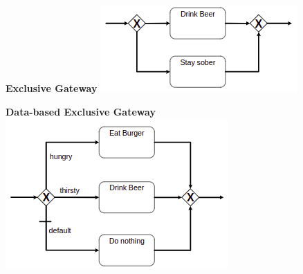    \begin{minipage}[t]{0.3\textwidth}
    \centering
    \textbf{Exclusive Gateway}
    \newline
    \newline
    \newline
    \newline
    \newline
	\includegraphics[width=1.05\linewidth]{images/BPMN_exclusive-gateway.png}
    \end{minipage}
    \begin{minipage}[t]{0.3\textwidth}
    \centering
    \textbf{Data-based Exclusive Gateway}
    \newline
    \newline
	\includegraphics[width=1.025\linewidth]{images/BPMN_data-based-exclusive-gateway.png}
	\newline
    \end{minipage}
